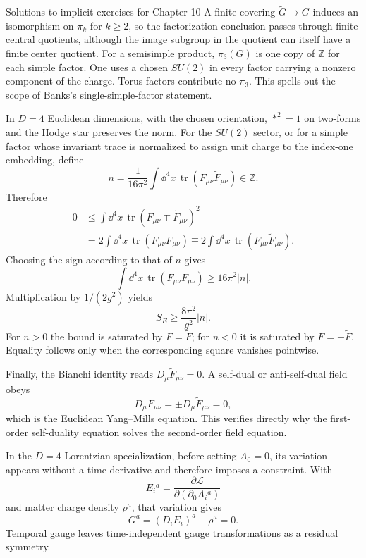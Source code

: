 \begin{bankssolutions}{Solutions to implicit exercises for Chapter 10}
A finite covering $\widetilde G\to G$ induces an isomorphism on $\pi_k$ for
$k\ge2$, so the factorization conclusion passes through finite central
quotients, although the image subgroup in the quotient can itself have a
finite center quotient.  For a
semisimple product, $\pi_3(G)$ is one copy of $\mathbb Z$ for each simple
factor.  One uses a chosen $SU(2)$ in every factor carrying a nonzero component
of the charge.  Torus factors contribute no $\pi_3$.  This spells out the
scope of Banks's single-simple-factor statement.

In $D=4$ Euclidean dimensions, with the chosen orientation, $*^2=1$ on two-forms and the Hodge star preserves
the norm.  For the $SU(2)$ sector, or for a simple factor whose invariant trace
is normalized to assign unit charge to the index-one embedding, define
\[
  n=\frac1{16\pi^2}\int\dd^4x\,
  \operatorname{tr}(F_{\mu\nu}\widetilde F_{\mu\nu})\in\mathbb Z.
\]
Therefore
\[
\begin{aligned}
  0&\le\int\dd^4x\,\operatorname{tr}
  (F_{\mu\nu}\mp\widetilde F_{\mu\nu})^2\\
  &=2\int\dd^4x\,\operatorname{tr}(F_{\mu\nu}F_{\mu\nu})
  \mp2\int\dd^4x\,\operatorname{tr}
  (F_{\mu\nu}\widetilde F_{\mu\nu}).
\end{aligned}
\]
Choosing the sign according to that of $n$ gives
\[
  \int\dd^4x\,\operatorname{tr}(F_{\mu\nu}F_{\mu\nu})
  \ge16\pi^2|n|.
\]
Multiplication by $1/(2g^2)$ yields
\[
  S_E\ge\frac{8\pi^2}{g^2}|n|.
\]
For $n>0$ the bound is saturated by $F=\widetilde F$; for $n<0$ it is
saturated by $F=-\widetilde F$.  Equality follows only when the corresponding
square vanishes pointwise.

Finally, the Bianchi identity reads $D_\mu\widetilde F_{\mu\nu}=0$.  A
self-dual or anti-self-dual field obeys
\[
  D_\mu F_{\mu\nu}=\pm D_\mu\widetilde F_{\mu\nu}=0,
\]
which is the Euclidean Yang--Mills equation.  This verifies directly why the
first-order self-duality equation solves the second-order field equation.

In the $D=4$ Lorentzian specialization, before setting $A_0=0$, its variation
appears without a time derivative and
therefore imposes a constraint.  With
\[
  E_i{}^a=\frac{\partial\mathcal L}{\partial(\partial_0A_i{}^a)}
\]
and matter charge density $\rho^a$, that variation gives
\[
  G^a=(D_iE_i)^a-\rho^a=0.
\]
Temporal gauge leaves time-independent gauge transformations as a residual
symmetry.


\end{bankssolutions}
